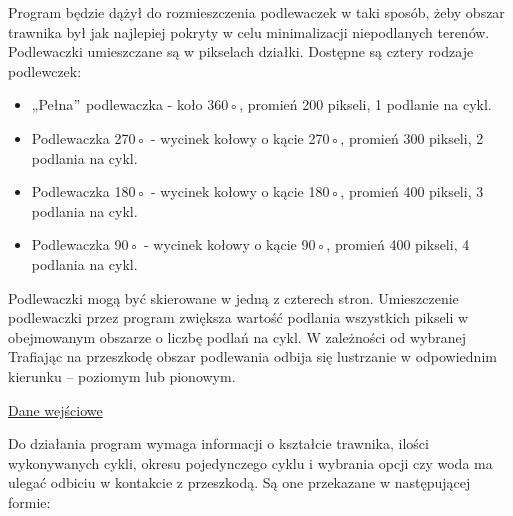 \documentclass[12pt]{article}
\renewcommand{\_}{\kern-1.5pt\textunderscore\kern-1.5pt}
\begin{document}
Program będzie dążył do rozmieszczenia podlewaczek w taki sposób, żeby obszar trawnika był jak najlepiej pokryty w celu minimalizacji niepodlanych terenów. Podlewaczki umieszczane są w pikselach działki. Dostępne są cztery rodzaje podlewczek:\par

\begin{itemize}
	\item „Pełna$"$  podlewaczka - koło 360◦, promień 200 pikseli, 1 podlanie na cykl.\par

	\item Podlewaczka 270◦ - wycinek kołowy o kącie 270◦, promień 300 pikseli, 2 podlania na cykl.\par

	\item Podlewaczka 180◦ - wycinek kołowy o kącie 180◦, promień 400 pikseli, 3 podlania na cykl.\par

	\item Podlewaczka 90◦ - wycinek kołowy o kącie 90◦, promień 400 pikseli, 4 podlania na cykl.
\end{itemize}\par

Podlewaczki mogą być skierowane w jedną z czterech stron. Umieszczenie podlewaczki przez program zwiększa wartość podlania wszystkich pikseli w obejmowanym obszarze o liczbę podlań na cykl. W zależności od wybranej Trafiając na przeszkodę obszar podlewania odbija się lustrzanie w odpowiednim kierunku – poziomym lub pionowym.\par


\vspace{\baselineskip}

\vspace{\baselineskip}

\vspace{\baselineskip}
{\fontsize{16pt}{19.2pt}\selectfont \uline{Dane wejściowe}\par}\par

Do działania program wymaga informacji o kształcie trawnika, ilości wykonywanych cykli, okresu pojedynczego cyklu i wybrania opcji czy woda ma ulegać odbiciu w kontakcie z przeszkodą. Są one przekazane w następującej formie:\par
\end{document}

